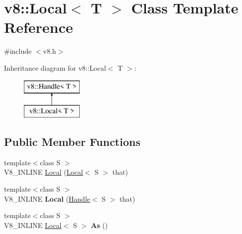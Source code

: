 \hypertarget{classv8_1_1_local}{}\section{v8\+:\+:Local$<$ T $>$ Class Template Reference}
\label{classv8_1_1_local}


{\ttfamily \#include $<$v8.\+h$>$}

Inheritance diagram for v8\+:\+:Local$<$ T $>$\+:\begin{figure}[H]
\begin{center}
\leavevmode
\includegraphics[height=2.000000cm]{classv8_1_1_local}
\end{center}
\end{figure}
\subsection*{Public Member Functions}
\begin{DoxyCompactItemize}
\item 
{\footnotesize template$<$class S $>$ }\\V8\+\_\+\+I\+N\+L\+I\+N\+E \hyperlink{classv8_1_1_local_a18d761713c1062a38f58a568fffe8f80}{Local} (\hyperlink{classv8_1_1_local}{Local}$<$ S $>$ that)
\item 
\hypertarget{classv8_1_1_local_a857c392e721d98a691cf638cc9ea1e8e}{}{\footnotesize template$<$class S $>$ }\\V8\+\_\+\+I\+N\+L\+I\+N\+E {\bfseries Local} (\hyperlink{classv8_1_1_handle}{Handle}$<$ S $>$ that)\label{classv8_1_1_local_a857c392e721d98a691cf638cc9ea1e8e}

\item 
\hypertarget{classv8_1_1_local_a18b55bc71ce2dcd084887097be4399eb}{}{\footnotesize template$<$class S $>$ }\\V8\+\_\+\+I\+N\+L\+I\+N\+E \hyperlink{classv8_1_1_local}{Local}$<$ S $>$ {\bfseries As} ()\label{classv8_1_1_local_a18b55bc71ce2dcd084887097be4399eb}

\end{DoxyCompactItemize}
